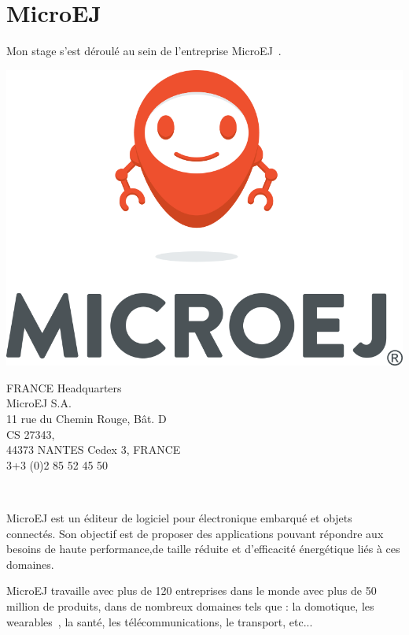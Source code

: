 \documentclass[french,a4paper,12pt]{report}
\begin{document}
\chapter{MicroEJ}

Mon stage s’est déroulé au sein de l’entreprise MicroEJ .\\

\bigskip

\noindent
\begin{minipage}[c]{0.5\textwidth}
\centering
\includegraphics[width=0.8\linewidth]{ressources/logos/vertical_mascot_huge.png}
\end{minipage}
\noindent
\begin{minipage}[c]{0.49\textwidth}\raggedright
 FRANCE Headquarters\\
 MicroEJ S.A.\\
 11 rue du Chemin Rouge, Bât. D\\
 CS 27343,\\
 44373 NANTES Cedex 3, FRANCE\\
 3+3 (0)2 85 52 45 50\\
\end{minipage}\\

\bigskip

MicroEJ est un éditeur de logiciel pour électronique embarqué et objets connectés. Son objectif est de proposer des applications pouvant répondre aux besoins de haute performance,de taille réduite et d'efficacité énergétique liés à ces domaines.

MicroEJ travaille avec plus de 120 entreprises dans le monde avec plus de 50 million de produits, dans de nombreux domaines tels que : la domotique, les wearables , la santé, les télécommunications, le transport, etc...
\end{document}
